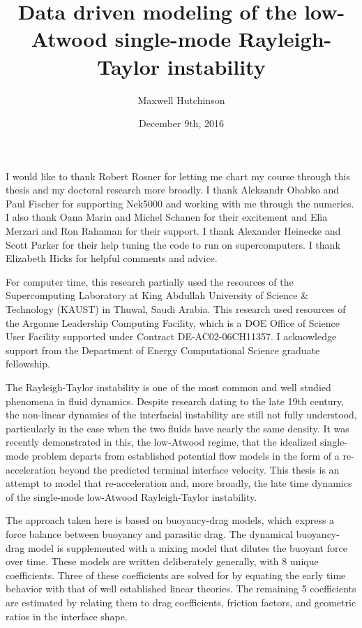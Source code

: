 \documentclass{ucetd}
\title{Data driven modeling of the low-Atwood single-mode Rayleigh-Taylor instability}
\author{Maxwell Hutchinson}
\date{December 9th, 2016}
\begin{document}
\maketitle

\makecopyright
\makededication
\makeepigraph


\tableofcontents
\listoffigures
\listoftables

\acknowledgments

I would like to thank Robert Rosner for letting me chart my course through this thesis and my doctoral research more broadly.
I thank Aleksandr Obabko and Paul Fischer for supporting Nek5000 and working with me through the numerics.
I also thank Oana Marin and Michel Schanen for their excitement and Elia Merzari and Ron Rahaman for their support.
I thank Alexander Heinecke and Scott Parker for their help tuning the code to run on supercomputers.
I thank Elizabeth Hicks for helpful comments and advice.

For computer time, this research partially used the resources of the
Supercomputing Laboratory at King Abdullah University of Science \& Technology
 (KAUST) in Thuwal, Saudi Arabia.
This research used resources of the Argonne Leadership Computing Facility, which
is a DOE Office of Science User Facility supported under Contract DE-AC02-06CH11357.
I acknowledge support from the Department of Energy Computational Science graduate fellowship.

\abstract

The Rayleigh-Taylor instability is one of the most common and well studied phenomena in fluid dynamics.
Despite research dating to
the late 19th century, the non-linear dynamics
of the interfacial instability are still not fully understood, particularly in the case when the two fluids have nearly the same density.
It was recently demonstrated in this, the low-Atwood regime, that the idealized single-mode problem departs from established potential flow models in the form of a re-acceleration beyond the predicted terminal interface velocity.
This thesis is an attempt to model that re-acceleration and, more broadly, the late time dynamics of the single-mode low-Atwood Rayleigh-Taylor instability.

The approach taken here is based on buoyancy-drag models, which express a force balance between buoyancy and parasitic drag.
The dynamical buoyancy-drag model is supplemented with a mixing model that dilutes the buoyant force over time.
These models are written deliberately generally, with 8 unique coefficients.
Three of these coefficients are solved for by equating the early time behavior with that of well established linear theories.
The remaining 5 coefficients are estimated by relating them to drag coefficients, friction factors, and geometric ratios in the interface shape.
\end{document}
